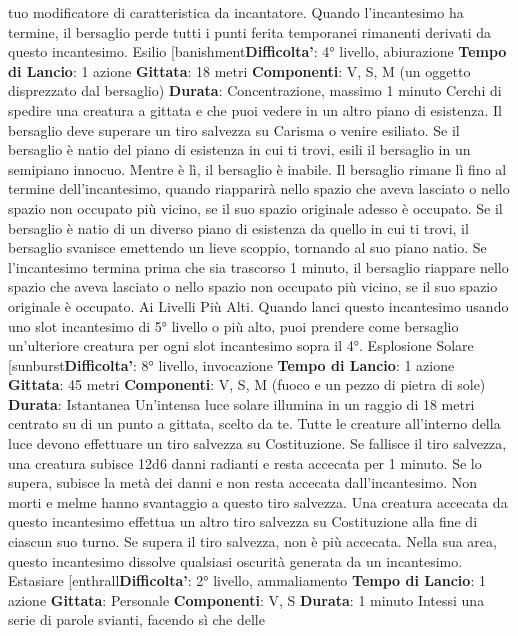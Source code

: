 \begin{multicols}{2}
tuo modificatore di caratteristica da incantatore.
Quando l’incantesimo ha termine, il bersaglio perde tutti 
i punti ferita temporanei rimanenti derivati da questo
incantesimo.
Esilio
[banishment\textbf{Difficolta'}:
4° livello, abiurazione
\textbf{Tempo di Lancio}: 1 azione
\textbf{Gittata}: 18 metri
\textbf{Componenti}: V, S, M (un oggetto disprezzato dal
bersaglio)
\textbf{Durata}: Concentrazione, massimo 1 minuto
Cerchi di spedire una creatura a gittata e che puoi
vedere in un altro piano di esistenza. Il bersaglio deve
superare un tiro salvezza su Carisma o venire esiliato.
Se il bersaglio è natio del piano di esistenza in cui ti
trovi, esili il bersaglio in un semipiano innocuo. Mentre è
lì, il bersaglio è inabile. Il bersaglio rimane lì fino al
termine dell’incantesimo, quando riapparirà nello spazio
che aveva lasciato o nello spazio non occupato più
vicino, se il suo spazio originale adesso è occupato.
Se il bersaglio è natio di un diverso piano di esistenza
da quello in cui ti trovi, il bersaglio svanisce emettendo
un lieve scoppio, tornando al suo piano natio. Se
l’incantesimo termina prima che sia trascorso 1 minuto,
il bersaglio riappare nello spazio che aveva lasciato o
nello spazio non occupato più vicino, se il suo spazio
originale è occupato.
Ai Livelli Più Alti. Quando lanci questo incantesimo
usando uno slot incantesimo di 5° livello o più alto, puoi
prendere come bersaglio un’ulteriore creatura per ogni
slot incantesimo sopra il 4°.
Esplosione Solare
[sunburst\textbf{Difficolta'}:
8° livello, invocazione
\textbf{Tempo di Lancio}: 1 azione
\textbf{Gittata}: 45 metri
\textbf{Componenti}: V, S, M (fuoco e un pezzo di pietra di
sole)
\textbf{Durata}: Istantanea
Un’intensa luce solare illumina in un raggio di 18 metri
centrato su di un punto a gittata, scelto da te. Tutte le
creature all’interno della luce devono effettuare un tiro
salvezza su Costituzione. Se fallisce il tiro salvezza,
una creatura subisce 12d6 danni radianti e resta
accecata per 1 minuto. Se lo supera, subisce la metà
dei danni e non resta accecata dall’incantesimo. Non
morti e melme hanno svantaggio a questo tiro salvezza.
Una creatura accecata da questo incantesimo effettua
un altro tiro salvezza su Costituzione alla fine di ciascun
suo turno. Se supera il tiro salvezza, non è più
accecata.
Nella sua area, questo incantesimo dissolve qualsiasi
oscurità generata da un incantesimo.
Estasiare
[enthrall\textbf{Difficolta'}:
2° livello, ammaliamento
\textbf{Tempo di Lancio}: 1 azione
\textbf{Gittata}: Personale
\textbf{Componenti}: V, S
\textbf{Durata}: 1 minuto
Intessi una serie di parole svianti, facendo sì che delle

\end{multicols}
